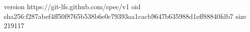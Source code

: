 version https://git-lfs.github.com/spec/v1
oid sha256:f287abef4ff50f8765b538b6e0c79393aa1cacb9647b635988d1eff88840fdb7
size 219117
